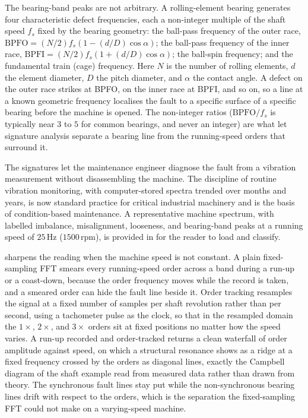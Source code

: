 The bearing-band peaks are not arbitrary. A rolling-element bearing
generates four characteristic defect frequencies, each a non-integer
multiple of the shaft speed $f_s$ fixed by the bearing geometry: the
ball-pass frequency of the outer race, $\text{BPFO} = (N/2) f_s (1 -
(d/D)\cos\alpha)$; the ball-pass frequency of the inner race,
$\text{BPFI} = (N/2) f_s (1 + (d/D)\cos\alpha)$; the ball-spin
frequency; and the fundamental train (cage) frequency. Here $N$ is the
number of rolling elements, $d$ the element diameter, $D$ the pitch
diameter, and $\alpha$ the contact angle. A defect on the outer race
strikes at BPFO, on the inner race at BPFI, and so on, so a line at a
known geometric frequency localises the fault to a specific surface of
a specific bearing before the machine is opened. The non-integer ratios
($\text{BPFO}/f_s$ is typically near $3$ to $5$ for common bearings,
and never an integer) are what let signature analysis separate a
bearing line from the running-speed orders that surround it.

The signatures let the maintenance engineer diagnose the fault from
a vibration measurement without disassembling the machine. The
discipline of routine vibration monitoring, with computer-stored
spectra trended over months and years, is now standard practice
for critical industrial machinery and is the basis of
condition-based maintenance. A representative machine spectrum, with
labelled imbalance, misalignment, looseness, and bearing-band peaks at
a running speed of $25\,\si{\hertz}$ ($1500\,\text{rpm}$), is provided
in  for the reader to load and
classify.

 sharpens the reading when the machine speed is
not constant. A plain fixed-sampling FFT smears every running-speed
order across a band during a run-up or a coast-down, because the order
frequency moves while the record is taken, and a smeared order can hide
the fault line beside it. Order tracking resamples the signal at a fixed
number of samples per shaft revolution rather than per second, using a
tachometer pulse as the clock, so that in the resampled domain the
$1\times$, $2\times$, and $3\times$ orders sit at fixed positions no
matter how the speed varies. A run-up recorded and order-tracked returns
a clean waterfall of order amplitude against speed, on which a structural
resonance shows as a ridge at a fixed frequency crossed by the orders as
diagonal lines, exactly the Campbell diagram of the shaft example read
from measured data rather than drawn from theory. The synchronous fault
lines stay put while the non-synchronous bearing lines drift with
respect to the orders, which is the separation the fixed-sampling FFT
could not make on a varying-speed machine.

